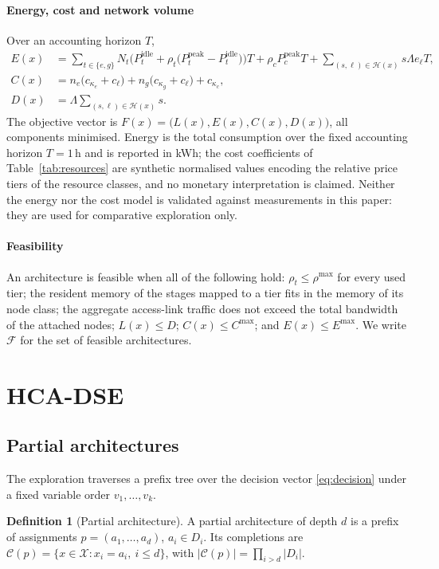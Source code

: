 \documentclass[preprint,11pt,3p]{elsarticle}
\theoremstyle{plain}
\theoremstyle{definition}
\newtheorem{definition}{Definition}
\newcommand{\X}{\mathcal{X}}
\newcommand{\C}{\mathcal{C}}
\newcommand{\F}{\mathcal{F}}
\begin{document}
\paragraph{Energy, cost and network volume}
Over an accounting horizon $T$,
\begin{align}
E(x) &= \sum_{t\in\{e,g\}} N_t\Big(P^{\mathrm{idle}}_t+\rho_t\big(P^{\mathrm{peak}}_t-P^{\mathrm{idle}}_t\big)\Big)T
      + \rho_c P^{\mathrm{peak}}_c T
      + \sum_{(s,\ell)\in\mathcal{H}(x)} s\Lambda e_\ell T, \label{eq:energy}\\
C(x) &= n_e\big(c_{\kappa_e}+c_\ell\big)+n_g\big(c_{\kappa_g}+c_\ell\big)+c_{\kappa_c},
\label{eq:cost}\\
D(x) &= \Lambda \sum_{(s,\ell)\in\mathcal{H}(x)} s .
\label{eq:netvol}
\end{align}
The objective vector is $F(x)=\big(L(x),E(x),C(x),D(x)\big)$, all components minimised.
Energy is the total consumption over the fixed accounting horizon $T=1$\,h and is
reported in kWh; the cost coefficients of Table~\ref{tab:resources} are synthetic
normalised values encoding the relative price tiers of the resource classes, and no
monetary interpretation is claimed. Neither the energy nor the cost model is validated
against measurements in this paper: they are used for comparative exploration only.

\paragraph{Feasibility}
An architecture is feasible when all of the following hold: $\rho_t\le\rho^{\max}$ for
every used tier; the resident memory of the stages mapped to a tier fits in the memory of
its node class; the aggregate access-link traffic does not exceed the total bandwidth of
the attached nodes; $L(x)\le D$; $C(x)\le C^{\max}$; and $E(x)\le E^{\max}$. We write
$\F$ for the set of feasible architectures.
\section{HCA-DSE}
\label{sec:method}

\subsection{Partial architectures}
The exploration traverses a prefix tree over the decision vector \eqref{eq:decision}
under a fixed variable order $v_1,\dots,v_k$.

\begin{definition}[Partial architecture]
A partial architecture of depth $d$ is a prefix of assignments
$p=(a_1,\dots,a_d)$, $a_i\in D_i$. Its completions are
$\C(p)=\{x\in\X: x_i=a_i,\ i\le d\}$, with $|\C(p)|=\prod_{i>d}|D_i|$.
\end{definition}
\end{document}
